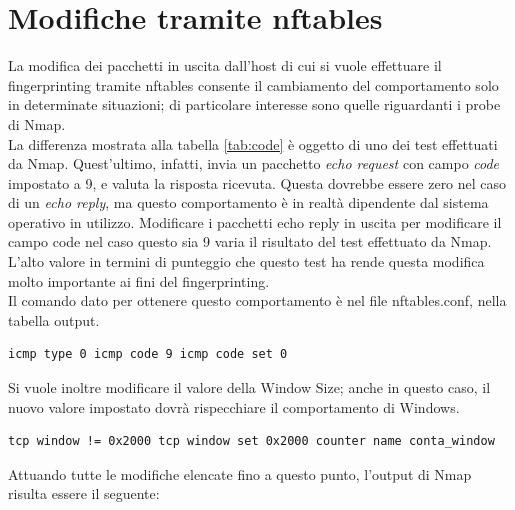 \section{Modifiche tramite nftables}
La modifica dei pacchetti in uscita dall'host di cui si vuole effettuare il fingerprinting tramite nftables consente il cambiamento del comportamento solo in determinate situazioni; di particolare interesse sono quelle riguardanti i probe di Nmap.
\\
La differenza mostrata alla tabella \ref{tab:code} è oggetto di uno dei test effettuati da Nmap. Quest'ultimo, infatti, invia un pacchetto \textit{echo request} con campo \textit{code} impostato a 9, e valuta la risposta ricevuta.
Questa dovrebbe essere zero nel caso di un \textit{echo reply}, ma questo comportamento è in realtà dipendente dal sistema operativo in utilizzo.
Modificare i pacchetti echo reply in uscita per modificare il campo code nel caso questo sia 9 varia il risultato del test effettuato da Nmap. L'alto valore in termini di punteggio che questo test ha rende questa modifica molto importante ai fini del fingerprinting.\\
Il comando dato per ottenere questo comportamento è nel file nftables.conf, nella tabella output.

\begin{lstlisting}[caption={Modifica del campo code in caso di test Nmap}, label=codice_icmp]
	icmp type 0 icmp code 9 icmp code set 0
\end{lstlisting}

Si vuole inoltre modificare il valore della Window Size; anche in questo caso, il nuovo valore impostato dovrà rispecchiare il comportamento di Windows.

\begin{lstlisting}[caption={Modifica della Window Size}]
	tcp window != 0x2000 tcp window set 0x2000 counter name conta_window
\end{lstlisting}

Attuando tutte le modifiche elencate fino a questo punto, l'output di Nmap risulta essere il seguente:

